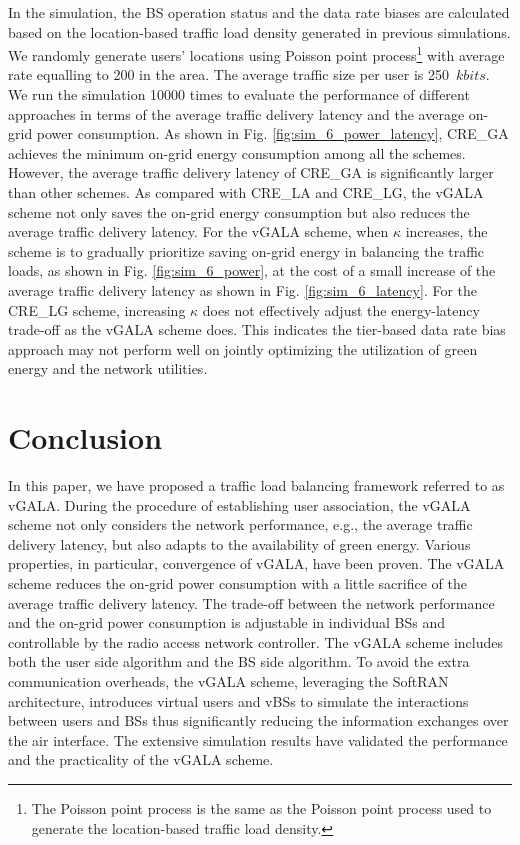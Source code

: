 \documentclass[journal]{IEEEtran}
\theoremstyle{definition}
\begin{document}
In the simulation, the BS operation status and the data rate biases are calculated based on the location-based traffic load density generated in previous simulations. We randomly generate users' locations using Poisson point process\footnote{The Poisson point process is the same as the Poisson point process used to generate the location-based traffic load density.} with average rate equalling to 200 in the area. The average traffic size per user is 250~$kbits$. We run the simulation 10000 times to evaluate the performance of different approaches in terms of the average traffic delivery latency and the average on-grid power consumption. As shown in Fig. \ref{fig:sim_6_power_latency}, CRE\_GA achieves the minimum on-grid energy consumption among all the schemes. However, the average traffic delivery latency of CRE\_GA is significantly larger than other schemes. As compared with CRE\_LA and CRE\_LG, the vGALA scheme not only saves the on-grid energy consumption but also reduces the average traffic delivery latency. For the vGALA scheme, when $\kappa$ increases, the scheme is to gradually prioritize saving on-grid energy in balancing the traffic loads, as shown in Fig. \ref{fig:sim_6_power}, at the cost of a small increase of the average traffic delivery latency as shown in Fig. \ref{fig:sim_6_latency}. For the CRE\_LG scheme, increasing $\kappa$ does not effectively adjust the energy-latency trade-off as the vGALA scheme does. This indicates the tier-based data rate bias approach may not perform well on jointly optimizing the utilization of green energy and the network utilities.






\section{Conclusion}
\label{sec:conclusion}
In this paper, we have proposed a traffic load balancing framework referred to as vGALA. During the procedure of establishing user association, the vGALA scheme not only considers the network performance, e.g., the average traffic delivery latency, but also adapts to the availability of green energy. Various properties, in particular, convergence of vGALA, have been proven. The vGALA scheme reduces the on-grid power consumption with a little sacrifice of the average traffic delivery latency. The trade-off between the network performance and the on-grid power consumption is adjustable in individual BSs and controllable by the radio access network controller. The vGALA scheme includes both the user side algorithm and the BS side algorithm. To avoid the extra communication overheads, the vGALA scheme, leveraging the SoftRAN architecture, introduces virtual users and vBSs to simulate the interactions between users and BSs thus significantly reducing the information exchanges over the air interface. The extensive simulation results have validated the performance and the practicality of the vGALA scheme.
\end{document}
